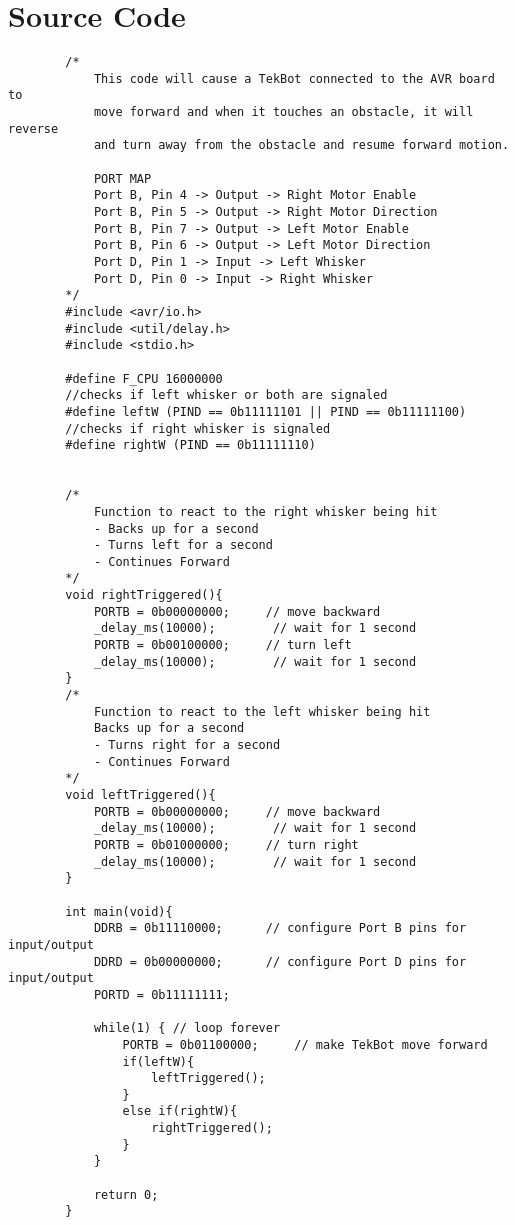 \documentclass[12pt,letterpaper]{article}
\begin{document}
\section{Source Code}
    \begin{verbatim}
        /*
            This code will cause a TekBot connected to the AVR board to
            move forward and when it touches an obstacle, it will reverse
            and turn away from the obstacle and resume forward motion.

            PORT MAP
            Port B, Pin 4 -> Output -> Right Motor Enable
            Port B, Pin 5 -> Output -> Right Motor Direction
            Port B, Pin 7 -> Output -> Left Motor Enable
            Port B, Pin 6 -> Output -> Left Motor Direction
            Port D, Pin 1 -> Input -> Left Whisker
            Port D, Pin 0 -> Input -> Right Whisker
        */
        #include <avr/io.h> 
        #include <util/delay.h> 
        #include <stdio.h>

        #define F_CPU 16000000
        //checks if left whisker or both are signaled
        #define leftW (PIND == 0b11111101 || PIND == 0b11111100) 
        //checks if right whisker is signaled
        #define rightW (PIND == 0b11111110)


        /*
            Function to react to the right whisker being hit
            - Backs up for a second
            - Turns left for a second
            - Continues Forward
        */
        void rightTriggered(){
            PORTB = 0b00000000;     // move backward
            _delay_ms(10000);        // wait for 1 second
            PORTB = 0b00100000;     // turn left
            _delay_ms(10000);        // wait for 1 second
        }
        /*
            Function to react to the left whisker being hit
            Backs up for a second
            - Turns right for a second
            - Continues Forward
        */
        void leftTriggered(){
            PORTB = 0b00000000;     // move backward
            _delay_ms(10000);        // wait for 1 second
            PORTB = 0b01000000;     // turn right
            _delay_ms(10000);        // wait for 1 second
        }

        int main(void){
            DDRB = 0b11110000;      // configure Port B pins for input/output
            DDRD = 0b00000000;      // configure Port D pins for input/output
            PORTD = 0b11111111;
            
            while(1) { // loop forever
                PORTB = 0b01100000;     // make TekBot move forward
                if(leftW){
                    leftTriggered();
                }
                else if(rightW){
                    rightTriggered();
                }
            }

            return 0;
        }
    \end{verbatim}
\end{document}
